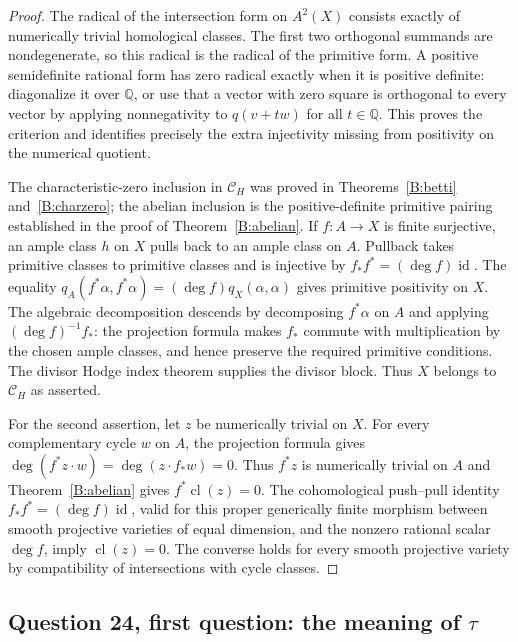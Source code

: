 \begin{proof}
The radical of the intersection form on $A^2(X)$ consists exactly of numerically trivial homological classes. The first two orthogonal summands are nondegenerate, so this radical is the radical of the primitive form. A positive semidefinite rational form has zero radical exactly when it is positive definite: diagonalize it over $\mathbb Q$, or use that a vector with zero square is orthogonal to every vector by applying nonnegativity to $q(v+tw)$ for all $t\in\mathbb Q$. This proves the criterion and identifies precisely the extra injectivity missing from positivity on the numerical quotient.

The characteristic-zero inclusion in $\mathscr C_H$ was proved in Theorems~\ref{B:betti} and~\ref{B:charzero}; the abelian inclusion is the positive-definite primitive pairing established in the proof of Theorem~\ref{B:abelian}. If $f:A\to X$ is finite surjective, an ample class $h$ on $X$ pulls back to an ample class on $A$. Pullback takes primitive classes to primitive classes and is injective by $f_*f^*=(\deg f)\operatorname{id}$. The equality $q_A(f^*\alpha,f^*\alpha)=(\deg f)q_X(\alpha,\alpha)$ gives primitive positivity on $X$. The algebraic decomposition descends by decomposing $f^*\alpha$ on $A$ and applying $(\deg f)^{-1}f_*$: the projection formula makes $f_*$ commute with multiplication by the chosen ample classes, and hence preserve the required primitive conditions. The divisor Hodge index theorem supplies the divisor block. Thus $X$ belongs to $\mathscr C_H$ as asserted.

For the second assertion, let $z$ be numerically trivial on $X$. For every complementary cycle $w$ on $A$, the projection formula gives $\deg(f^*z\cdot w)=\deg(z\cdot f_*w)=0$. Thus $f^*z$ is numerically trivial on $A$ and Theorem~\ref{B:abelian} gives $f^*\operatorname{cl}(z)=0$. The cohomological push--pull identity $f_*f^*=(\deg f)\operatorname{id}$, valid for this proper generically finite morphism between smooth projective varieties of equal dimension, and the nonzero rational scalar $\deg f$, imply $\operatorname{cl}(z)=0$. The converse holds for every smooth projective variety by compatibility of intersections with cycle classes.
\end{proof}

\subsection{Question 24, first question: the meaning of \texorpdfstring{$\tau$}{tau}}

